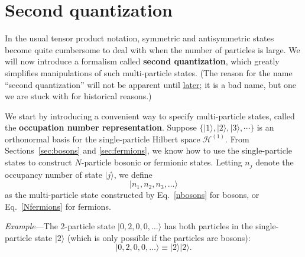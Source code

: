 \documentclass[prx,12pt]{revtex4-2}
\begin{document}
\clearpage

\section{Second quantization}
\label{sec:secondquant}

In the usual tensor product notation, symmetric and antisymmetric
states become quite cumbersome to deal with when the number of
particles is large.  We will now introduce a formalism called
\textbf{second quantization}, which greatly simplifies manipulations
of such multi-particle states.  (The reason for the name ``second
quantization'' will not be apparent until
\hyperref[second_quantization_terminology]{later}; it is a bad name,
but one we are stuck with for historical reasons.)

We start by introducing a convenient way to specify multi-particle
states, called the \textbf{occupation number representation}.  Suppose
$\{|1\rangle, |2\rangle, |3\rangle, \cdots\}$ is an orthonormal basis
for the single-particle Hilbert space $\mathscr{H}^{(1)}$.  From
Sections~\ref{sec:bosons} and \ref{sec:fermions}, we know how to use
the single-particle states to construct $N$-particle bosonic or
fermionic states.  Letting $n_j$ denote the occupancy number of state
$|j\rangle$, we define
\begin{equation*}
  |n_1,n_2,n_3,\dots\rangle
\end{equation*}
as the multi-particle state constructed by Eq.~\eqref{nbosons} for
bosons, or Eq.~\eqref{Nfermions} for fermions.

\begin{framed}
\noindent
\textit{Example}---The 2-particle state $|0,2,0,0,\dots\rangle$ has
both particles in the single-particle state $|2\rangle$ (which is only
possible if the particles are bosons):
\begin{equation}
  |0,2,0,0,\dots\rangle \equiv |2\rangle|2\rangle.
\end{equation}
\end{framed}
\end{document}
